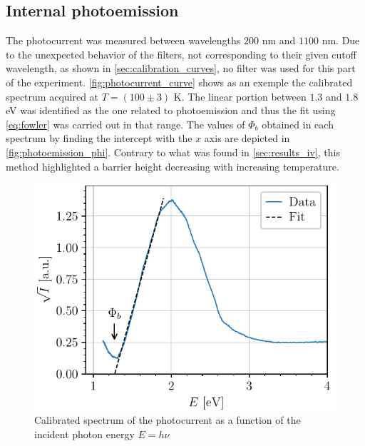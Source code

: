 \begin{figure}[htbp]
\begin{minipage}[t]{0.49\textwidth}
        \label{fig:richardson}
    \end{minipage}
\end{figure}

\subsection{Internal photoemission} \label{sec:results_photoemission}
The photocurrent was measured between wavelengths $200$ nm and $1100$ nm.
Due to the unexpected behavior of the filters, not corresponding to their given cutoff wavelength, as shown in \autoref{sec:calibration_curves}, no filter was used for this part of the experiment.
\autoref{fig:photocurrent_curve} shows as an exemple the calibrated spectrum acquired at $T = (100\pm3)$ K.
The linear portion between $1.3$ and $1.8$ eV was identified as the one related to photoemission and thus the fit using \autoref{eq:fowler} was carried out in that range.
The values of $\Phi_b$ obtained in each spectrum by finding the intercept with the $x$ axis are depicted in \autoref{fig:photoemission_phi}.
Contrary to what was found in  \autoref{sec:results_iv}, this method highlighted a barrier height decreasing with increasing temperature.
\begin{figure}[htbp]
    \centering
    \vspace{-0.2cm}
    \includegraphics[scale=1]{figures/photocurrent_curve.pdf}
    \caption{Calibrated spectrum of the photocurrent as a function of the incident photon energy $E=h\nu$}
    \label{fig:photocurrent_curve}
    \vspace{-1.5cm}
\end{figure}
